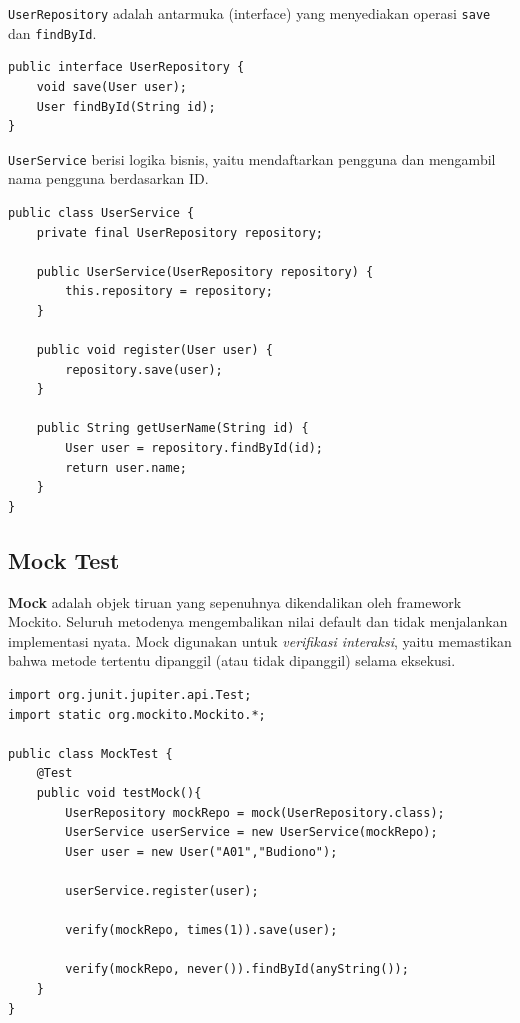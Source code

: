 \documentclass[a4paper,oneside,12pt]{report}
\begin{document}
\texttt{UserRepository} adalah antarmuka (interface) yang menyediakan operasi \texttt{save} dan \texttt{findById}.

\begin{lstlisting}[style=javastyle, caption={UserRepository.java}]
public interface UserRepository {
    void save(User user);
    User findById(String id);
}
\end{lstlisting}

\texttt{UserService} berisi logika bisnis, yaitu mendaftarkan pengguna dan mengambil nama pengguna berdasarkan ID.

\begin{lstlisting}[style=javastyle, caption={UserService.java}]
public class UserService {
    private final UserRepository repository;

    public UserService(UserRepository repository) {
        this.repository = repository;
    }

    public void register(User user) {
        repository.save(user);
    }

    public String getUserName(String id) {
        User user = repository.findById(id);
        return user.name;
    }
}
\end{lstlisting}

\subsection{Mock Test}

\textbf{Mock} adalah objek tiruan yang sepenuhnya dikendalikan oleh framework Mockito. Seluruh metodenya mengembalikan nilai default dan tidak menjalankan implementasi nyata. Mock digunakan untuk \textit{verifikasi interaksi}, yaitu memastikan bahwa metode tertentu dipanggil (atau tidak dipanggil) selama eksekusi.

\begin{lstlisting}[style=javastyle, caption={MockTest.java}]
import org.junit.jupiter.api.Test;
import static org.mockito.Mockito.*;

public class MockTest {
    @Test
    public void testMock(){
        UserRepository mockRepo = mock(UserRepository.class);
        UserService userService = new UserService(mockRepo);
        User user = new User("A01","Budiono");

        userService.register(user);

        verify(mockRepo, times(1)).save(user);

        verify(mockRepo, never()).findById(anyString());
    }
}
\end{lstlisting}
\end{document}
